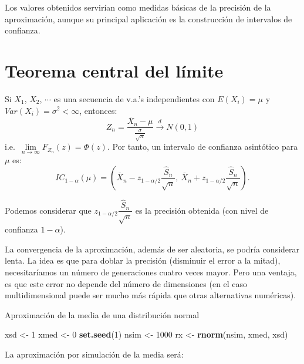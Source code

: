 \documentclass[
]{book}
\newenvironment{Shaded}{\begin{snugshade}}{\end{snugshade}}
\newcommand{\DecValTok}[1]{\textcolor[rgb]{0.00,0.00,0.81}{#1}}
\newcommand{\KeywordTok}[1]{\textcolor[rgb]{0.13,0.29,0.53}{\textbf{#1}}}
\newcommand{\NormalTok}[1]{#1}
\newcommand{\StringTok}[1]{\textcolor[rgb]{0.31,0.60,0.02}{#1}}
\theoremstyle{break}
\theoremstyle{definition}
\theoremstyle{definition}
\theoremstyle{definition}
\theoremstyle{remark}
\let\BeginKnitrBlock\begin \let\EndKnitrBlock\end
\begin{document}
Los valores obtenidos servirían como medidas básicas de la precisión
de la aproximación, aunque su principal aplicación es la
construcción de intervalos de confianza.

\hypertarget{teorema-central-del-luxedmite}{%
\section{Teorema central del límite}\label{teorema-central-del-luxedmite}}

Si \(X_{1}\), \(X_{2}\), \(\cdots\) es una secuencia de v.a.'s
independientes con \(E\left( X_{i}\right) =\mu\) y
\(Var\left( X_{i}\right) = \sigma ^{2}<\infty\), entonces:
\[Z_{n}=\frac{\overline{X}_{n}-\mu }{\frac{\sigma }{\sqrt{n}}}
\overset{d}{ \rightarrow } N(0,1)\]
i.e.~\(\lim\limits_{n\rightarrow \infty }F_{Z_{n}}(z)=\Phi (z)\).
Por tanto, un intervalo de confianza asintótico para \(\mu\) es:
\[IC_{1-\alpha }(\mu ) = \left( \overline{X}_{n}
- z_{1-\alpha /2}\dfrac{\widehat{S}_{n}}{\sqrt{n}},\ 
\overline{X}_n+z_{1-\alpha /2}\dfrac{\widehat{S}_{n}}{\sqrt{n}} \right).\]

Podemos considerar que
\(z_{1-\alpha /2}\dfrac{\widehat{S}_{n}}{\sqrt{n}}\)
es la precisión obtenida (con nivel de confianza \(1-\alpha\)).

La convergencia de la aproximación, además de ser aleatoria, se podría considerar lenta.
La idea es que para doblar la precisión (disminuir el error a la mitad), necesitaríamos un número de generaciones cuatro veces mayor. Pero una ventaja, es que este error no depende del número de dimensiones (en el caso multidimensional puede ser mucho más rápida que otras alternativas numéricas).

\BeginKnitrBlock{example}
\protect\hypertarget{exm:unnamed-chunk-5}{}{\label{exm:unnamed-chunk-5} }Aproximación de la media de una distribución normal
\EndKnitrBlock{example}

\begin{Shaded}
\begin{Highlighting}[]
\NormalTok{xsd <-}\StringTok{ }\DecValTok{1}
\NormalTok{xmed <-}\StringTok{ }\DecValTok{0}
\KeywordTok{set.seed}\NormalTok{(}\DecValTok{1}\NormalTok{)}
\NormalTok{nsim <-}\StringTok{ }\DecValTok{1000}
\NormalTok{rx <-}\StringTok{ }\KeywordTok{rnorm}\NormalTok{(nsim, xmed, xsd)}
\end{Highlighting}
\end{Shaded}

La aproximación por simulación de la media será:
\end{document}
